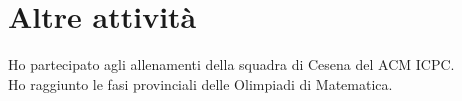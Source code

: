 \documentclass[curriculum-vitae]{subfiles}
\begin{document}
	\section*{Altre attività}
		 Ho partecipato agli allenamenti della squadra di Cesena del ACM ICPC.\\

		 Ho raggiunto le fasi provinciali delle Olimpiadi di Matematica.
	
\end{document}
